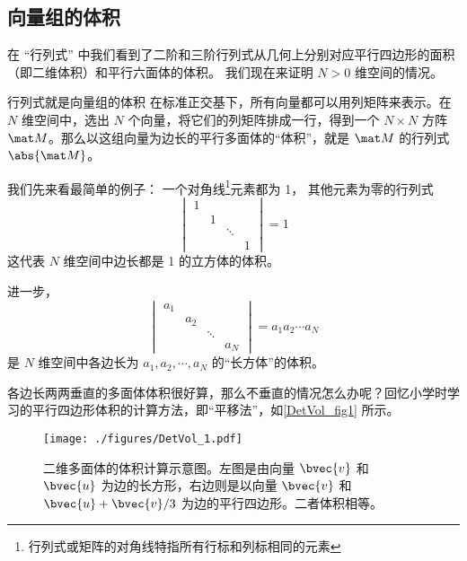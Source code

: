 

\subsection{向量组的体积}

在 “行列式” 中我们看到了二阶和三阶行列式从几何上分别对应平行四边形的面积（即二维体积）和平行六面体的体积。 我们现在来证明 $N > 0$ 维空间的情况。

\begin{theorem}{行列式就是向量组的体积}
在标准正交基下，所有向量都可以用列矩阵来表示。在 $N$ 维空间中，选出 $N$ 个向量，将它们的列矩阵排成一行，得到一个 $N\times N$ 方阵 $\mat M$。那么以这组向量为边长的平行多面体的“体积”，就是 $\mat M$ 的行列式 $\abs{\mat M}$。
\end{theorem}


我们先来看最简单的例子： 一个对角线\footnote{行列式或矩阵的对角线特指所有行标和列标相同的元素}元素都为 1， 其他元素为零的行列式
\begin{equation}
\begin{vmatrix}
1 & & &\\
  & 1 & &\\
  &  & \ddots &\\
  & & & 1
\end{vmatrix} = 1
\end{equation}
这代表 $N$ 维空间中边长都是 1 的立方体的体积。

进一步，
\begin{equation}
\begin{vmatrix}
a_1 & & &\\
  & a_2 & &\\
  &  & \ddots &\\
  & & & a_N
\end{vmatrix} = a_1a_2\cdots a_N
\end{equation}
是 $N$ 维空间中各边长为 $a_1, a_2, \cdots, a_N$ 的“长方体”的体积。

各边长两两垂直的多面体体积很好算，那么不垂直的情况怎么办呢？回忆小学时学习的平行四边形体积的计算方法，即“平移法”，如\autoref{DetVol_fig1} 所示。
\begin{figure}[ht]
\centering
\texttt{[image: ./figures/DetVol\_1.pdf]}
\caption{二维多面体的体积计算示意图。左图是由向量 $\bvec{v}$ 和 $\bvec{u}$ 为边的长方形，右边则是以向量 $\bvec{v}$ 和 $\bvec{u}+\bvec{v}/3$ 为边的平行四边形。二者体积相等。} \label{DetVol_fig1}
\end{figure}

